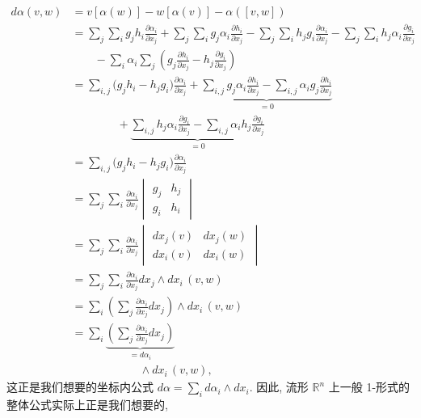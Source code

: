 \begin{align*}
d\alpha(v,w)&=v[\alpha(w)]-w[\alpha(v)]-\alpha([v,w])\\
&=\sum_j\sum_i g_jh_i\frac{\partial\alpha_i}{\partial x_j}
+\sum_j\sum_i g_j\alpha_i\frac{\partial h_i}{\partial x_j}
-\sum_j\sum_i h_jg_i\frac{\partial\alpha_i}{\partial x_j}
-\sum_j\sum_i h_j\alpha_i\frac{\partial g_i}{\partial x_j}\\
&\qquad-\sum_i\alpha_i\sum_j\left(g_j\frac{\partial h_i}{\partial x_j}-h_j\frac{\partial g_i}{\partial x_j}\right)\\
&=\sum_{i,j}\bigl(g_jh_i-h_jg_i\bigr)\frac{\partial\alpha_i}{\partial x_j}
+\underbrace{\sum_{i,j}g_j\alpha_i\frac{\partial h_i}{\partial x_j}
-\sum_{i,j}\alpha_ig_j\frac{\partial h_i}{\partial x_j}}_{=0}\\
&\qquad\qquad+\underbrace{\sum_{i,j}h_j\alpha_i\frac{\partial g_i}{\partial x_j}
-\sum_{i,j}\alpha_ih_j\frac{\partial g_i}{\partial x_j}}_{=0}\\
&=\sum_{i,j}\bigl(g_jh_i-h_jg_i\bigr)\frac{\partial\alpha_i}{\partial x_j}\\
&=\sum_j\sum_i\frac{\partial\alpha_i}{\partial x_j}
\begin{vmatrix}g_j&h_j\\g_i&h_i\end{vmatrix}\\
&=\sum_j\sum_i\frac{\partial\alpha_i}{\partial x_j}
\begin{vmatrix}dx_j(v)&dx_j(w)\\dx_i(v)&dx_i(w)\end{vmatrix}\\
&=\sum_j\sum_i\frac{\partial\alpha_i}{\partial x_j}dx_j\wedge dx_i\,(v,w)\\
&=\sum_i\left(\sum_j\frac{\partial\alpha_i}{\partial x_j}dx_j\right)\wedge dx_i\,(v,w)\\
&=\sum_i\underbrace{\left(\sum_j\frac{\partial\alpha_i}{\partial x_j}dx_j\right)}_{=d\alpha_i}\\
&\qquad\qquad\qquad\wedge dx_i\,(v,w),
\end{align*}
这正是我们想要的坐标内公式 $d\alpha=\sum_i d\alpha_i\wedge dx_i$. 因此, 流形 $\mathbb{R}^n$ 上一般 1-形式的整体公式实际上正是我们想要的, 
\begin{center}
\end{center}

